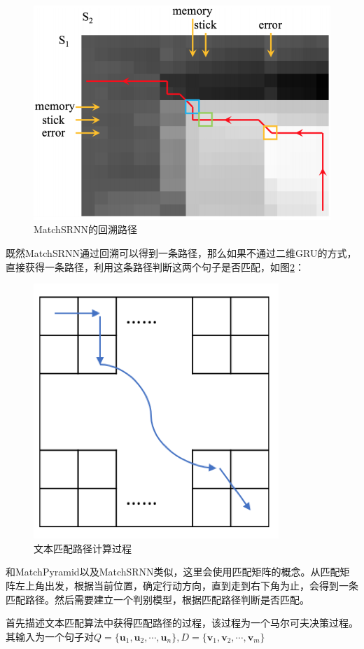 \begin{figure}[!htbp]\centering
\vspace{1em}
  \includegraphics[width=0.6\linewidth]{figures/LD_dis}
  \caption{MatchSRNN的回溯路径}
  \label{fig:LD_dis}       %
  \vspace{1em}
\end{figure}

既然MatchSRNN通过回溯可以得到一条路径，那么如果不通过二维GRU的方式，直接获得一条路径，利用这条路径判断这两个句子是否匹配，如图\ref{fig:match_MDP}：

\begin{figure}[!htbp]\centering
\vspace{1em}
  \includegraphics[width=0.5\linewidth]{figures/match_MDP}
  \caption{文本匹配路径计算过程}
  \label{fig:match_MDP}       %
  \vspace{1em}
\end{figure}

和MatchPyramid以及MatchSRNN类似，这里会使用匹配矩阵的概念。从匹配矩阵左上角出发，根据当前位置，确定行动方向，直到走到右下角为止，会得到一条匹配路径。然后需要建立一个判别模型，根据匹配路径判断是否匹配。

首先描述文本匹配算法中获得匹配路径的过程，该过程为一个马尔可夫决策过程。其输入为一个句子对$Q=\{\mathbf{u}_1, \mathbf{u}_2,\cdots,\mathbf{u}_n\}, D=\{\mathbf{v}_1, \mathbf{v}_2,\cdots,\mathbf{v}_m\}$

